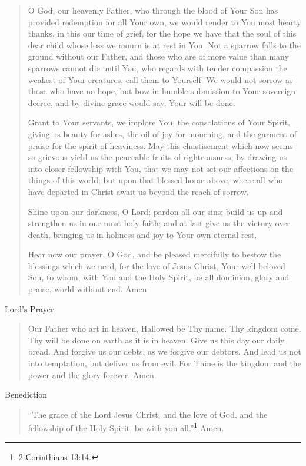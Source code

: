 \documentclass[
]{book}
\begin{document}
\begin{quote}
O God, our heavenly Father, who through the blood of Your Son has provided redemption for all Your own, we would render to You most hearty thanks, in this our time of grief, for the hope we have that the soul of this dear child whose loss we mourn is at rest in You. Not a sparrow falls to the ground without our Father, and those who are of more value than many sparrows cannot die until You, who regards with tender compassion the weakest of Your creatures, call them to Yourself. We would not sorrow as those who have no hope, but bow in humble submission to Your sovereign decree, and by divine grace would say, Your will be done.

Grant to Your servants, we implore You, the consolations of Your Spirit, giving us beauty for ashes, the oil of joy for mourning, and the garment of praise for the spirit of heaviness. May this chastisement which now seems so grievous yield us the peaceable fruits of righteousness, by drawing us into closer fellowship with You, that we may not set our affections on the things of this world; but upon that blessed home above, where all who have departed in Christ await us beyond the reach of sorrow.

Shine upon our darkness, O Lord; pardon all our sins; build us up and strengthen us in our most holy faith; and at last give us the victory over death, bringing us in holiness and joy to Your own eternal rest.

Hear now our prayer, O God, and be pleased mercifully to bestow the blessings which we need, for the love of Jesus Christ, Your well-beloved Son, to whom, with You and the Holy Spirit, be all dominion, glory and praise, world without end. Amen.
\end{quote}

Lord's Prayer

\begin{quote}
Our Father who art in heaven, Hallowed be Thy name. Thy kingdom come. Thy will be done on earth as it is in heaven. Give us this day our daily bread. And forgive us our debts, as we forgive our debtors. And lead us not into temptation, but deliver us from evil. For Thine is the kingdom and the power and the glory forever. Amen.
\end{quote}

Benediction

\begin{quote}
``The grace of the Lord Jesus Christ, and the love of God, and the fellowship of the Holy Spirit, be with you all.''\footnote{2 Corinthians 13:14.} Amen.
\end{quote}
\end{document}
